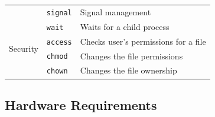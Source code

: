 \documentclass[10pt,a4paper]{article}
\begin{document}
\begin{table}[b]
\begin{tabular}{l l l}
	                                     & \texttt{signal}   & Signal management                                   \\
	                                     & \texttt{wait}     & Waits for a child process                           \\
	\midrule
	\multirow{2}{*}{Security}            & \texttt{access}   & Checks user's permissions for a file                \\
	                                     & \texttt{chmod}    & Changes the file permissions                        \\
	                                     & \texttt{chown}    & Changes the file ownership                          \\
	\bottomrule
\end{tabular}
\end{table}


\subsection{Hardware Requirements}
\label{section: hardware requirements}
\end{document}
